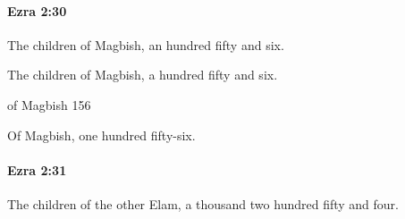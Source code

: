 		\paragraph{Ezra 2:30} %
			\label{EZRA-2-30}

			The children of Magbish, an hundred fifty and six.

			\begin{versebox}
					\item[BHS] 
					\item[LXX] 
					\item[ASV] The children of Magbish, a hundred fifty and six.
					\item[NIV] of Magbish 156
					\item[NRSV] Of Magbish, one hundred fifty-six.
			\end{versebox}

		\paragraph{Ezra 2:31} %
			\label{EZRA-2-31}

			The children of the other Elam, a thousand two hundred fifty and four.

